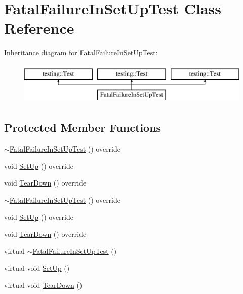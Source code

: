 \hypertarget{class_fatal_failure_in_set_up_test}{}\section{Fatal\+Failure\+In\+Set\+Up\+Test Class Reference}
\label{class_fatal_failure_in_set_up_test}
Inheritance diagram for Fatal\+Failure\+In\+Set\+Up\+Test\+:\begin{figure}[H]
\begin{center}
\leavevmode
\includegraphics[height=2.000000cm]{d2/d30/class_fatal_failure_in_set_up_test}
\end{center}
\end{figure}
\subsection*{Protected Member Functions}
\begin{DoxyCompactItemize}
\item 
\mbox{\hyperlink{class_fatal_failure_in_set_up_test_af626d6417897e3351d62f3a04a74e245}{$\sim$\+Fatal\+Failure\+In\+Set\+Up\+Test}} () override
\item 
void \mbox{\hyperlink{class_fatal_failure_in_set_up_test_acaee8e6db4d744f0a98aa6f2e399df3a}{Set\+Up}} () override
\item 
void \mbox{\hyperlink{class_fatal_failure_in_set_up_test_af5aeffabb2d3d92169b26a14883b4c26}{Tear\+Down}} () override
\item 
\mbox{\hyperlink{class_fatal_failure_in_set_up_test_af626d6417897e3351d62f3a04a74e245}{$\sim$\+Fatal\+Failure\+In\+Set\+Up\+Test}} () override
\item 
void \mbox{\hyperlink{class_fatal_failure_in_set_up_test_acaee8e6db4d744f0a98aa6f2e399df3a}{Set\+Up}} () override
\item 
void \mbox{\hyperlink{class_fatal_failure_in_set_up_test_af5aeffabb2d3d92169b26a14883b4c26}{Tear\+Down}} () override
\item 
virtual \mbox{\hyperlink{class_fatal_failure_in_set_up_test_a915ca362b046259c3586c1ab72bb0a93}{$\sim$\+Fatal\+Failure\+In\+Set\+Up\+Test}} ()
\item 
virtual void \mbox{\hyperlink{class_fatal_failure_in_set_up_test_a455696f86fb5f5393624221ccb79b373}{Set\+Up}} ()
\item 
virtual void \mbox{\hyperlink{class_fatal_failure_in_set_up_test_a457707161063e08f7b6600ec5db449e4}{Tear\+Down}} ()
\end{DoxyCompactItemize}
